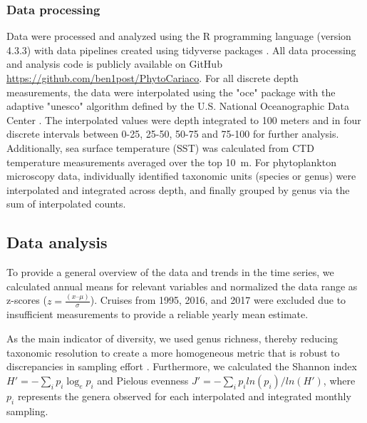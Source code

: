 \documentclass[draft]{agujournal2019}
\begin{document}
    \subsubsection{Data processing}
    Data were processed and analyzed using the R programming language (version 4.3.3) \cite{r_core_team_r_2024} with data pipelines created using tidyverse packages \cite{wickham_welcome_2019}. All data processing and analysis code is publicly available on GitHub \url{https://github.com/ben1post/PhytoCariaco}.
    For all discrete depth measurements, the data were interpolated using the "oce" package \cite{kelley_oce_2023} with the adaptive "unesco" algorithm defined by the U.S. National Oceanographic Data Center \cite{johnson2006world}. The interpolated values were depth integrated to 100 meters and in four discrete intervals between 0-25, 25-50, 50-75 and 75-100 \meter for further analysis. Additionally, sea surface temperature (SST) was calculated from CTD temperature measurements averaged over the top \qty{10}{\meter}. For phytoplankton microscopy data, individually identified taxonomic units (species or genus) were interpolated and integrated across depth, and finally grouped by genus via the sum of interpolated counts.


\subsection{Data analysis}    
    To provide a general overview of the data and trends in the time series, we calculated annual means for relevant variables and normalized the data range as z-scores ($z = \frac{(x – \mu)}{\sigma}$). Cruises from 1995, 2016, and 2017 were excluded due to insufficient measurements to provide a reliable yearly mean estimate. 
    
    As the main indicator of diversity, we used genus richness, thereby reducing taxonomic resolution to create a more homogeneous metric that is robust to discrepancies in sampling effort \cite{ptacnik_diversity_2008, de2020higher}. Furthermore, we calculated the Shannon index $H' = -\sum_i p_i \log_{e} p_i$ and Pielou\textquotesingle s evenness $J' = -\sum_i p_i ln( p_i )/ln(H')$, where $p_i$ represents the genera observed for each interpolated and integrated monthly sampling. 

      
\end{document}
